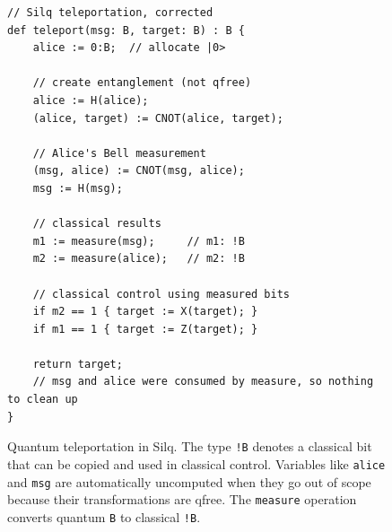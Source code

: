 \begin{figure}[t]
\begin{verbatim}
// Silq teleportation, corrected
def teleport(msg: B, target: B) : B {
    alice := 0:B;  // allocate |0>

    // create entanglement (not qfree)
    alice := H(alice);
    (alice, target) := CNOT(alice, target);

    // Alice's Bell measurement
    (msg, alice) := CNOT(msg, alice);
    msg := H(msg);

    // classical results
    m1 := measure(msg);     // m1: !B
    m2 := measure(alice);   // m2: !B

    // classical control using measured bits
    if m2 == 1 { target := X(target); }
    if m1 == 1 { target := Z(target); }

    return target;
    // msg and alice were consumed by measure, so nothing to clean up
}
\end{verbatim}
\caption{Quantum teleportation in Silq. The type \texttt{!B} denotes a classical bit that can be copied and used in classical control. Variables like \texttt{alice} and \texttt{msg} are automatically uncomputed when they go out of scope because their transformations are qfree. The \texttt{measure} operation converts quantum \texttt{B} to classical \texttt{!B}.}
\label{fig:silq-teleport}
\end{figure}
